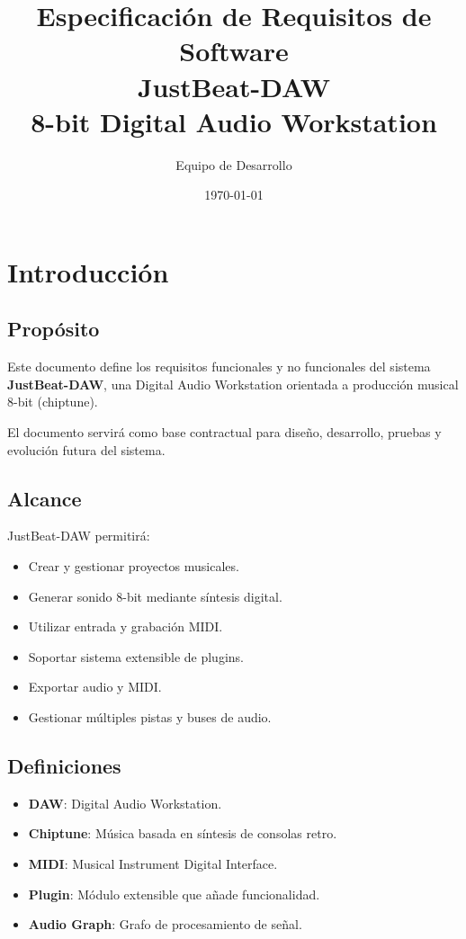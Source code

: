 \documentclass[12pt]{article}
\title{\textbf{\textcolor{primary}{Especificación de Requisitos de Software}}\\
\vspace{0.3cm}
JustBeat-DAW\\
\large 8-bit Digital Audio Workstation}
\author{Equipo de Desarrollo}
\date{\today}
\begin{document}
\maketitle
\tableofcontents
\newpage

\section{Introducción}

\subsection{Propósito}

Este documento define los requisitos funcionales y no funcionales del sistema \textbf{JustBeat-DAW}, una Digital Audio Workstation orientada a producción musical 8-bit (chiptune).

El documento servirá como base contractual para diseño, desarrollo, pruebas y evolución futura del sistema.

\subsection{Alcance}

JustBeat-DAW permitirá:

\begin{itemize}
\item Crear y gestionar proyectos musicales.
\item Generar sonido 8-bit mediante síntesis digital.
\item Utilizar entrada y grabación MIDI.
\item Soportar sistema extensible de plugins.
\item Exportar audio y MIDI.
\item Gestionar múltiples pistas y buses de audio.
\end{itemize}

\subsection{Definiciones}

\begin{itemize}
\item \textbf{DAW}: Digital Audio Workstation.
\item \textbf{Chiptune}: Música basada en síntesis de consolas retro.
\item \textbf{MIDI}: Musical Instrument Digital Interface.
\item \textbf{Plugin}: Módulo extensible que añade funcionalidad.
\item \textbf{Audio Graph}: Grafo de procesamiento de señal.
\end{itemize}
\end{document}
